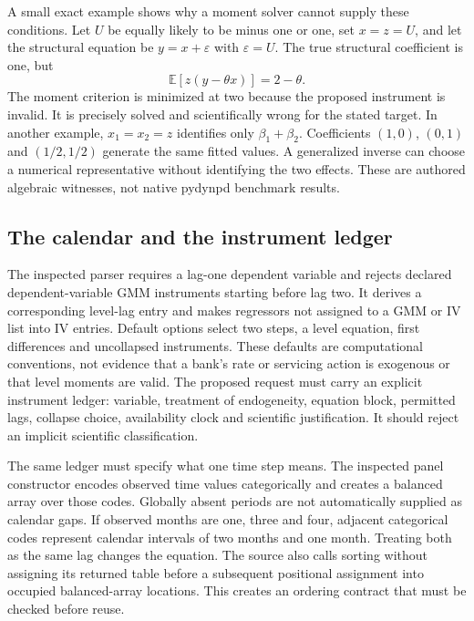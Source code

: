 A small exact example shows why a moment solver cannot supply these conditions.
Let $U$ be equally likely to be minus one or one, set $x=z=U$, and let the structural
equation be $y=x+\varepsilon$ with $\varepsilon=U$. The true structural coefficient
is one, but
\begin{equation}
 \mathbb E[z(y-\theta x)]=2-\theta.
\end{equation}
The moment criterion is minimized at two because the proposed instrument is invalid.
It is precisely solved and scientifically wrong for the stated target. In another
example, $x_1=x_2=z$ identifies only $\beta_1+\beta_2$. Coefficients $(1,0)$,
$(0,1)$ and $(1/2,1/2)$ generate the same fitted values. A generalized inverse can
choose a numerical representative without identifying the two effects.
These are authored algebraic witnesses, not native pydynpd benchmark results.
\citep{exec24_pydynpd_reference}

\subsection{The calendar and the instrument ledger}
The inspected parser requires a lag-one dependent variable and rejects declared
dependent-variable GMM instruments starting before lag two. It derives a corresponding
level-lag entry and makes regressors not assigned to a GMM or IV list into IV entries.
Default options select two steps, a level equation, first differences and uncollapsed
instruments. These defaults are computational conventions, not evidence that a bank's
rate or servicing action is exogenous or that level moments are valid. The proposed
request must carry an explicit instrument ledger: variable, treatment of endogeneity,
equation block, permitted lags, collapse choice, availability clock and scientific
justification. It should reject an implicit scientific classification.
\citep{exec24_pydynpd_source}

The same ledger must specify what one time step means. The inspected panel constructor
encodes observed time values categorically and creates a balanced array over those codes.
Globally absent periods are not automatically supplied as calendar gaps. If observed
months are one, three and four, adjacent categorical codes represent calendar intervals
of two months and one month. Treating both as the same lag changes the equation.
The source also calls sorting without assigning its returned table before a subsequent
positional assignment into occupied balanced-array locations. This creates an ordering
contract that must be checked before reuse.~\citep{exec24_pydynpd_source}

